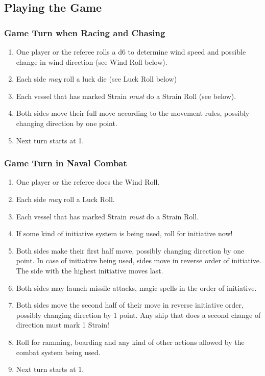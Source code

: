 \documentclass[11pt]{wbzine}
\begin{document}
\begin{multicols}{2}
\subsection{Playing the Game}

\subsubsection{Game Turn when Racing and
Chasing}

\begin{enumerate}
\item
  One player or the referee rolls a d6 to determine wind speed and
  possible change in wind direction (see Wind Roll below).
\item
  Each side \emph{may} roll a luck die (see Luck Roll below)
\item
  Each vessel that has marked Strain \emph{must} do a Strain Roll (see
  below).
\item
  Both sides move their full move according to the movement rules,
  possibly changing direction by one point.
\item
  Next turn starts at 1.
\end{enumerate}

\subsubsection{Game Turn in Naval Combat}

\begin{enumerate}
\item
  One player or the referee does the Wind Roll.
\item
  Each side \emph{may} roll a Luck Roll.
\item
  Each vessel that has marked Strain \emph{must} do a Strain Roll.
\item
  If some kind of initiative system is being used, roll for initiative
  now!
\item
  Both sides make their first half move, possibly changing direction by
  one point. In case of initiative being used, sides move in reverse
  order of initiative. The side with the highest initiative moves last.
\item
  Both sides may launch missile attacks, magic spells in the order of
  initiative.
\item
  Both sides move the second half of their move in reverse initiative
  order, possibly changing direction by 1 point. Any ship that does a
  second change of direction must mark 1 Strain!
\item
  Roll for ramming, boarding and any kind of other actions allowed by
  the combat system being used.
\item
  Next turn starts at 1.
\end{enumerate}


\end{multicols}
\end{document}

